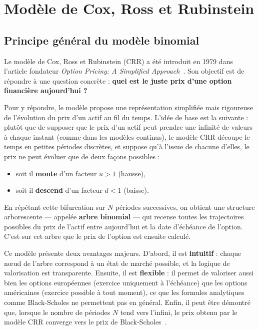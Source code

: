 \documentclass[11pt]{report}
\begin{document}
\chapter{Modèle de Cox, Ross et Rubinstein}

\section{Principe général du modèle binomial}

Le modèle de Cox, Ross et Rubinstein (CRR) a été introduit en 1979 dans
l'article fondateur \textit{Option Pricing: A Simplified Approach}~\cite{crr1979}.
Son objectif est de répondre à une question concrète : \textbf{quel est le
juste prix d'une option financière aujourd'hui ?}

Pour y répondre, le modèle propose une représentation simplifiée mais
rigoureuse de l'évolution du prix d'un actif au fil du temps. L'idée de
base est la suivante : plutôt que de supposer que le prix d'un actif peut
prendre une infinité de valeurs à chaque instant (comme dans les modèles
continus), le modèle CRR découpe le temps en petites périodes discrètes,
et suppose qu'à l'issue de chacune d'elles, le prix ne peut évoluer que de
deux façons possibles :

\begin{itemize}
    \item soit il \textbf{monte} d'un facteur $u > 1$ (hausse),
    \item soit il \textbf{descend} d'un facteur $d < 1$ (baisse).
\end{itemize}

En répétant cette bifurcation sur $N$ périodes successives, on obtient
une structure arborescente — appelée \textbf{arbre binomial} — qui recense
toutes les trajectoires possibles du prix de l'actif entre aujourd'hui et
la date d'échéance de l'option. C'est sur cet arbre que le prix de l'option
est ensuite calculé.

Ce modèle présente deux avantages majeurs. D'abord, il est \textbf{intuitif} :
chaque nœud de l'arbre correspond à un état de marché possible, et la logique
de valorisation est transparente. Ensuite, il est \textbf{flexible} : il
permet de valoriser aussi bien les options européennes (exercice uniquement
à l'échéance) que les options américaines (exercice possible à tout moment),
ce que les formules analytiques comme Black-Scholes ne permettent pas en
général. Enfin, il peut être démontré que, lorsque le nombre de périodes $N$
tend vers l'infini, le prix obtenu par le modèle CRR converge vers le prix
de Black-Scholes~\cite{crr1979}.
\end{document}
